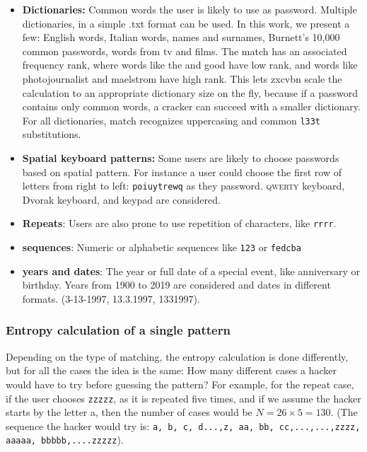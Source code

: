\begin{itemize}
\setlength\itemsep{0pt}

\item \textbf{Dictionaries:} Common words the user is likely to use as password. Multiple dictionaries, in a simple .txt format can be used. In this work, we present a few: English words, Italian words, names and surnames, Burnett’s 10,000 common passwords, words from tv and films. The match has an associated frequency rank, where words like the and good have low rank, and words like photojournalist and maelstrom have high rank. This lets zxcvbn scale the calculation to an appropriate dictionary size on the fly, because if a password contains only common words, a cracker can succeed with a smaller dictionary. For all dictionaries, match recognizes uppercasing and common \texttt{l33t} substitutions.

\item \textbf{Spatial keyboard patterns:} Some users are likely to choose passwords based on spatial pattern. For instance a user could choose the first row of letters from right to left: \texttt{poiuytrewq} as they password. \textsc{qwerty} keyboard, Dvorak keyboard, and keypad are considered.

\item \textbf{Repeats}: Users are also prone to use repetition of characters, like \texttt{rrrr}. 

\item \textbf{sequences}: Numeric or alphabetic sequences like \texttt{123} or \texttt{fedcba}

\item \textbf{years and dates}: The year or full date of a special event, like anniversary or birthday. Years from 1900 to 2019 are considered and dates in different formats. (3-13-1997, 13.3.1997, 1331997). 

\end{itemize}

\subsubsection*{Entropy calculation of a single pattern}
Depending on the type of matching, the entropy calculation is done differently, but for all the cases the idea is the same: How many different cases a hacker would have to try before guessing the pattern? For example, for the repeat case, if the user chooses \texttt{zzzzz}, as it is repeated five times, and if we assume the hacker starts by the letter a, then the number of cases would be $ N = 26 \times 5 = 130 $. (The sequence the hacker would try is: \texttt{a, b, c, d...,z, aa, bb, cc,...,...,zzzz, aaaaa, bbbbb,....zzzzz}).


